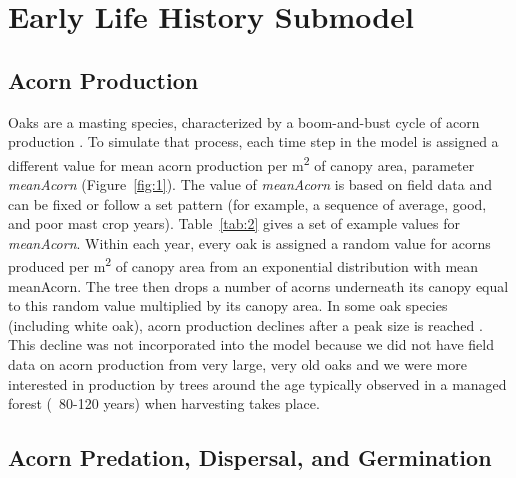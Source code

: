 \documentclass[
11pt, %
a4paper, %
oneside, %
headinclude,footinclude, %
]{scrartcl}
\begin{document}
\section{Early Life History Submodel}
\label{earlylife}

\subsection{Acorn Production}

Oaks are a masting species, characterized by a boom-and-bust cycle of acorn production \citep{Lusk2007}. To simulate that process, each time step in the model is assigned a different value for mean acorn production per m\textsuperscript{2} of canopy area, parameter \textit{meanAcorn} (Figure~\ref{fig:1}). The value of \textit{meanAcorn} is based on field data \citep{Kellner2014b} and can be fixed or follow a set pattern (for example, a sequence of average, good, and poor mast crop years). Table~\ref{tab:2} gives a set of example values for \textit{meanAcorn}. Within each year, every oak is assigned a random value for acorns produced per m\textsuperscript{2} of canopy area from an exponential distribution with mean meanAcorn. The tree then drops a number of acorns underneath its canopy equal to this random value multiplied by its canopy area. In some oak species (including white oak), acorn production declines after a peak size is reached \citep{Downs1944}. This decline was not incorporated into the model because we did not have field data on acorn production from very large, very old oaks and we were more interested in production by trees around the age typically observed in a managed forest (~80-120 years) when harvesting takes place.



\subsection{Acorn Predation, Dispersal, and Germination}
\end{document}
